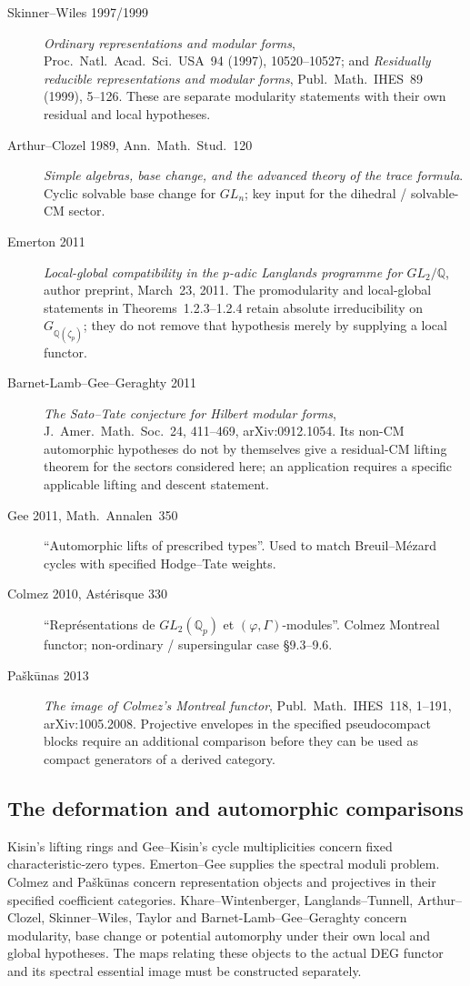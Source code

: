 \begin{description}
\item[Skinner--Wiles 1997/1999]
\emph{Ordinary representations and modular forms}, Proc.\ Natl.\ Acad.\
Sci.\ USA~94 (1997), 10520--10527; and
\emph{Residually reducible representations and modular forms},
Publ.\ Math.\ IHES~89 (1999), 5--126. These are separate modularity
statements with their own residual and local hypotheses.
\item[Arthur--Clozel 1989, Ann.~Math.~Stud.~120] \emph{Simple algebras,
base change, and the advanced theory of the trace formula}. Cyclic
solvable base change for \(GL_{n}\); key input for the dihedral /
solvable-CM sector.
\item[Emerton 2011]
\emph{Local-global compatibility in the $p$-adic Langlands programme
for $GL_2/\mathbb Q$}, author preprint, March~23, 2011.
The promodularity and local-global statements in Theorems~1.2.3--1.2.4
retain absolute irreducibility on $G_{\mathbb Q(\zeta_p)}$; they do
not remove that hypothesis merely by supplying a local functor.
\item[Barnet-Lamb--Gee--Geraghty 2011]
\emph{The Sato--Tate conjecture for Hilbert modular forms},
J.\ Amer.\ Math.\ Soc.~24, 411--469, arXiv:0912.1054.
Its non-CM automorphic hypotheses do not by themselves give a
residual-CM lifting theorem for the sectors considered here; an
application requires a specific applicable lifting and descent statement.
\item[Gee 2011, Math.~Annalen~350] ``Automorphic lifts of prescribed
types''. Used to match Breuil--M{\'e}zard cycles with specified
Hodge--Tate weights.
\item[Colmez 2010, Ast{\'e}risque 330] ``Repr{\'e}sentations de
\(GL_{2}(\mathbb{Q}_{p})\) et \((\varphi,\Gamma)\)-modules''. Colmez
Montreal functor; non-ordinary / supersingular case \S 9.3--9.6.
\item[Pa\v{s}k\=unas 2013]
\emph{The image of Colmez's Montreal functor}, Publ.\ Math.\ IHES~118,
1--191, arXiv:1005.2008. Projective envelopes in the specified
pseudocompact blocks require an additional comparison before they can
be used as compact generators of a derived category.
\end{description}

\subsection{The deformation and automorphic comparisons}
Kisin's lifting rings and Gee--Kisin's cycle multiplicities concern
fixed characteristic-zero types. Emerton--Gee supplies the spectral
moduli problem. Colmez and Pa\v{s}k\=unas concern representation
objects and projectives in their specified coefficient categories.
Khare--Wintenberger, Langlands--Tunnell, Arthur--Clozel, Skinner--Wiles,
Taylor and Barnet-Lamb--Gee--Geraghty concern modularity, base change
or potential automorphy under their own local and global hypotheses.
The maps relating these objects to the actual DEG functor and its
spectral essential image must be constructed separately.
